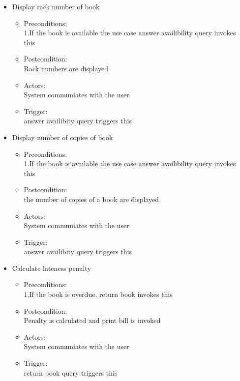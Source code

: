 \documentclass[a4paper]{article}
\begin{document}
\begin{enumerate}
\begin{itemize}
\item Display rack number of book\\ 
	\begin{itemize}
	\item  Preconditions:\\ 1.If the book is available the use case answer availibility query invokes this\\ 
 \item Postcondition:\\  Rack numbers are displayed\\ 
 \item Actors:\\  System communiates with the user\\ 
 \item Trigger:\\  answer availibity query triggers this\\ 
	\end{itemize}
 
 \item Display number of copies of book\\ 
	\begin{itemize}
	\item  Preconditions:\\ 1.If the book is available the use case answer availibility query invokes this\\ 
 \item Postcondition:\\  the number of copies of a book are displayed\\ 
 \item Actors: \\ System communiates with the user\\ 
 \item Trigger:\\  answer availibity query triggers this\\ 
	\end{itemize}

\item Calculate lateness penalty\\ 
	\begin{itemize}
	\item  Preconditions:\\ 1.If the book is overdue, return book invokes this\\ 
 \item Postcondition:\\ Penalty is calculated and print bill is invoked\\ 
 \item Actors: \\ System communiates with the user\\ 
 \item Trigger: \\ return book query triggers this\\ 
	\end{itemize}
 

\end{itemize}
\end{enumerate}
\end{document}
